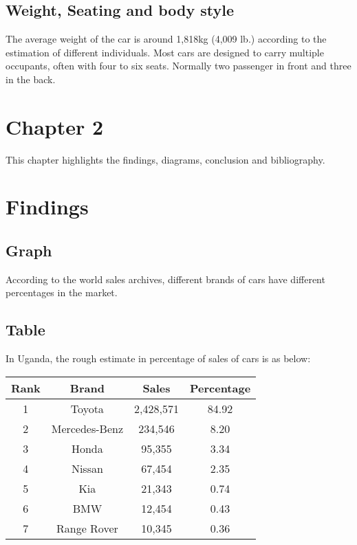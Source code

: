 \documentclass[12]{article}
\begin{document}
\subsection{Weight, Seating and body style}
The average weight of the car is around 1,818kg (4,009 lb.) according to the estimation of different individuals. Most cars are designed to carry multiple occupants, often with four to six seats. Normally two passenger in front and three in the back.

\section{Chapter 2}
This chapter highlights the findings, diagrams, conclusion and bibliography.

\section{Findings}
\subsection{Graph}
According to the world sales archives, different brands of cars have different percentages in the market.




\subsection{Table}
In Uganda, the rough estimate in percentage of sales of cars is as below:
\begin{center}
\begin{tabular}{|| c c c c ||}
\hline
Rank  &  Brand  &  Sales  &  Percentage \\
[0.5ex]
\hline\hline
1  &  Toyota  &  2,428,571  &  84.92\\
\hline
2  & Mercedes-Benz  &  234,546  &  8.20 \\
\hline
3  &  Honda  &  95,355  &  3.34 \\
\hline
4  & Nissan  &  67,454  & 2.35 \\
\hline
5  &  Kia  &  21,343  & 0.74\\
\hline
6  &  BMW  &  12,454  & 0.43\\
\hline
7  &  Range Rover  &  10,345  & 0.36 \\ [1ex]
\hline
\end{tabular}
\end{center}
\end{document}
